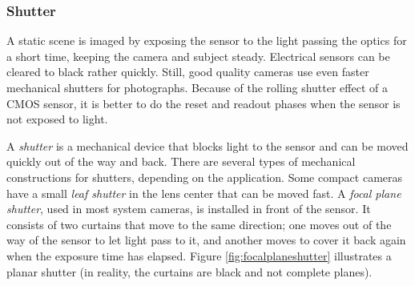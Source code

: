
\subsubsection{Shutter} %


A static scene is imaged by exposing the sensor to the light passing the optics for a short time, keeping the camera and subject steady.
Electrical sensors can be cleared to black rather quickly.
Still, good quality cameras use even faster mechanical shutters for photographs.
Because of the rolling shutter effect of a CMOS sensor, it is better to do the reset and readout phases when the sensor is not exposed to light.





A \emph{shutter} is a mechanical device that blocks light to the sensor and can be moved quickly out of the way and back.
There are several types of mechanical constructions for shutters, depending on the application.
Some compact cameras have a small \emph{leaf shutter} in the lens center that can be moved fast.
A \emph{focal plane shutter}, used in most system cameras, is installed in front of the sensor.
It consists of two curtains that move to the same direction; one moves out of the way of the sensor to let light pass to it, and another moves to cover it back again when the exposure time has elapsed.
Figure \ref{fig:focalplaneshutter} illustrates a planar shutter (in reality, the curtains are black and not complete planes).

